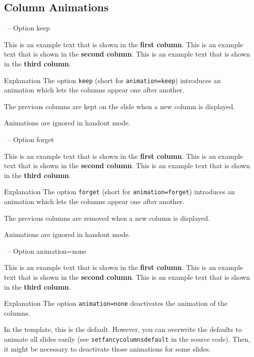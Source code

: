 \documentclass[
	aspectratio=169, %
	8pt, %
]{beamer}
\begin{document}
\subsection{Column Animations}
\begin{frame}{\insertsubsection\ -- Option keep}
	\begin{fancycolumns}[columns=3,keep] %
		This is an example text that is shown in the \textbf{first column}.
	\nextcolumn
		This is an example text that is shown in the \textbf{second column}.
	\nextcolumn
		This is an example text that is shown in the \textbf{third column}.
	\end{fancycolumns}
	\vfill
	\begin{info}{Explanation}
		The option \texttt{keep} (short for \texttt{animation=keep}) introduces an animation which lets the columns appear one after another.

		The previous columns are kept on the slide when a new column is displayed.

		Animations are ignored in handout mode.
	\end{info}
\end{frame}

\begin{frame}{\insertsubsection\ -- Option forget}
	\begin{fancycolumns}[columns=3,forget] %
		This is an example text that is shown in the \textbf{first column}.
	\nextcolumn
		This is an example text that is shown in the \textbf{second column}.
	\nextcolumn
		This is an example text that is shown in the \textbf{third column}.
	\end{fancycolumns}
	\vfill
	\begin{info}{Explanation}
		The option \texttt{forget} (short for \texttt{animation=forget}) introduces an animation which lets the columns appear one after another.

		The previous columns are removed when a new column is displayed.

		Animations are ignored in handout mode.
	\end{info}
\end{frame}

\begin{frame}{\insertsubsection\ -- Option animation=none}
	\begin{fancycolumns}[columns=3,animation=none]
		This is an example text that is shown in the \textbf{first column}.
	\nextcolumn
		This is an example text that is shown in the \textbf{second column}.
	\nextcolumn
		This is an example text that is shown in the \textbf{third column}.
	\end{fancycolumns}
	\vfill
	\begin{info}{Explanation}
		The option \texttt{animation=none} deactivates the animation of the columns.

		In the template, this is the default. However, you can overwrite the defaults to animate all slides easily (see \texttt{setfancycolumnsdefault} in the source code). Then, it might be necessary to deactivate those animations for some slides.
	\end{info}
\end{frame}
\end{document}
